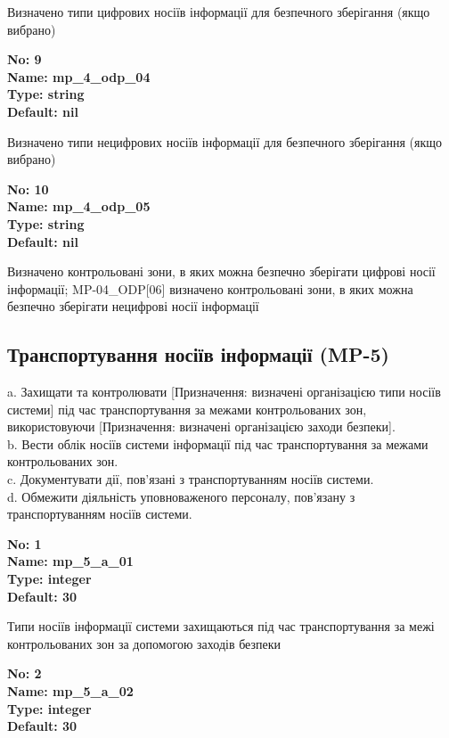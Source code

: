 \documentclass{article}
\begin{document}
{\footnotesize Визначено типи цифрових носіїв інформації для безпечного зберігання (якщо вибрано)}


{\footnotesize\bfseries
No: 9\\
Name: mp\_\allowbreak{}4\_\allowbreak{}odp\_\allowbreak{}04\\
Type: string\\
Default: nil
}

{\footnotesize Визначено типи нецифрових носіїв інформації для безпечного зберігання (якщо вибрано)}


{\footnotesize\bfseries
No: 10\\
Name: mp\_\allowbreak{}4\_\allowbreak{}odp\_\allowbreak{}05\\
Type: string\\
Default: nil
}

{\footnotesize Визначено контрольовані зони, в яких можна безпечно зберігати цифрові носії інформації; MP-04\_\allowbreak{}ODP[06] визначено контрольовані зони, в яких можна безпечно зберігати нецифрові носії інформації}




\subsection{Транспортування носіїв інформації (MP-5)}
a. Захищати та контролювати [Призначення: визначені організацією типи носіїв системи] під час транспортування за межами контрольованих зон, використовуючи [Призначення: визначені організацією заходи безпеки].\\ 
b. Вести облік носіїв системи інформації під час транспортування за межами контрольованих зон.\\ 
c. Документувати дії, пов'язані з транспортуванням носіїв системи.\\ 
d. Обмежити діяльність уповноваженого персоналу, пов'язану з транспортуванням носіїв системи.

\vspace{10pt}
{\footnotesize\bfseries
No: 1\\
Name: mp\_\allowbreak{}5\_\allowbreak{}a\_\allowbreak{}01\\
Type: integer\\
Default: 30
}

{\footnotesize Типи носіїв інформації системи захищаються під час транспортування за межі контрольованих зон за допомогою заходів безпеки}


{\footnotesize\bfseries
No: 2\\
Name: mp\_\allowbreak{}5\_\allowbreak{}a\_\allowbreak{}02\\
Type: integer\\
Default: 30
}
\end{document}
